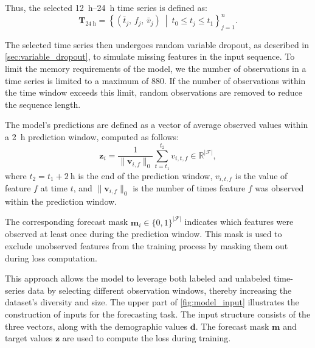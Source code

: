 Thus, the selected \qtyrange{12}{24}{\hour} time series is defined as:
\begin{equation}
    \label{eq:input_24_window}
    \mathbf{T}_{\qty{24}{\hour}} = \left\{ \left( \bar{t}_j, \, f_j, \, \bar{v}_j \right) \ \middle|\ t_0 \leq t_j \leq t_1 \right\}_{j = 1}^{n}.
\end{equation}

The selected time series then undergoes random variable dropout, as described in \cref{sec:variable_dropout}, to simulate missing features in the input sequence. To limit the memory requirements of the model, we the number of observations in a time series is limited to a maximum of \num{880}. If the number of observations within the time window exceeds this limit, random observations are removed to reduce the sequence length.

The model's predictions are defined as a vector of average observed values within a \qty{2}{\hour} prediction window, computed as follows:
\begin{equation}
    \label{eq:forecast_target}
    \mathbf{z}_i = \frac{1}{\| \mathbf{v}_{i,f} \|_0 } \sum^{t_2}_{t=t_1} v_{i,t,f} \in \mathbb{R}^{|\mathcal{F}|},
\end{equation}
where \( t_2 = t_1 + \qty{2}{\hour} \) is the end of the prediction window, \( v_{i,t,f} \) is the value of feature \( f \) at time \( t \), and \( \| \mathbf{v}_{i,f} \|_0 \) is the number of times feature \( f \) was observed within the prediction window.

The corresponding forecast mask \( \mathbf{m}_i \in \{0, 1\}^{|\mathcal{F}|} \) indicates which features were observed at least once during the prediction window. This mask is used to exclude unobserved features from the training process by masking them out during loss computation.

This approach allows the model to leverage both labeled and unlabeled time-series data by selecting different observation windows, thereby increasing the dataset's diversity and size. The upper part of \cref{fig:model_input} illustrates the construction of inputs for the forecasting task. The input structure consists of the three vectors, along with the demographic values \( \mathbf{d} \). The forecast mask \( \mathbf{m} \) and target values \( \mathbf{z} \) are used to compute the loss during training.


